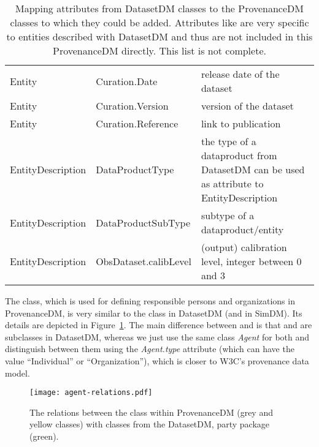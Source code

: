 \begin{table}[ht]
\small
{}\textwidth
\begin{tabulary}{1.0\textwidth}{llL}
\toprule
{} &  & \\
\midrule
Entity           & Curation.Date          & release date of the dataset\\
Entity           & Curation.Version       & version of the dataset\\
Entity           & Curation.Reference     & link to publication\\
EntityDescription & DataProductType & the type of a dataproduct from DatasetDM can be used as attribute to EntityDescription\\
EntityDescription & DataProductSubType    & subtype of a \mbox{dataproduct}/entity\\
EntityDescription & ObsDataset.calibLevel & (output) calibration level, integer between 0 and 3\\
\bottomrule
\end{tabulary}
\caption[Mapping attributes from DatasetDM classes to the ProvenanceDM classes]{Mapping attributes from DatasetDM classes to the ProvenanceDM classes to which they could be added. Attributes like  are very specific to entities described with DatasetDM and thus are not included in this ProvenanceDM directly. This list is not complete.}
\label{tab:datasetmapping2}
\end{table}


The  class, which is used for defining responsible persons and 
organizations in ProvenanceDM, is very similar to the  class in DatasetDM (and in SimDM). Its details are depicted in Figure~\ref{fig:agent-relations}.
The main difference between  and  is that  and  are subclasses in DatasetDM, whereas we just use the same class \emph{Agent} for both and distinguish between them using the \emph{Agent.type} attribute (which can have the value ``Individual'' or ``Organization''), which is closer to W3C's provenance data model.

\begin{figure}[ht]
\centering
\texttt{[image: agent-relations.pdf]}
\caption[Agent in ProvenanceDM and Party in DatasetDM]{The relations between the  class within ProvenanceDM 
(grey and yellow classes) with classes from the DatasetDM, party package (green).}
\label{fig:agent-relations}
\end{figure}

